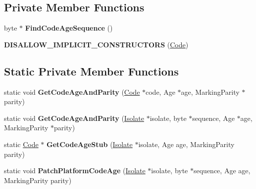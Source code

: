 \subsection*{Private Member Functions}
\begin{DoxyCompactItemize}
\item 
byte $\ast$ {\bfseries Find\+Code\+Age\+Sequence} ()\hypertarget{classv8_1_1internal_1_1_code_af7fe9dd72381ab449b39d57040648c57}{}\label{classv8_1_1internal_1_1_code_af7fe9dd72381ab449b39d57040648c57}

\item 
{\bfseries D\+I\+S\+A\+L\+L\+O\+W\+\_\+\+I\+M\+P\+L\+I\+C\+I\+T\+\_\+\+C\+O\+N\+S\+T\+R\+U\+C\+T\+O\+RS} (\hyperlink{classv8_1_1internal_1_1_code}{Code})\hypertarget{classv8_1_1internal_1_1_code_abd9d152bb12178f233f612a10f4fca1f}{}\label{classv8_1_1internal_1_1_code_abd9d152bb12178f233f612a10f4fca1f}

\end{DoxyCompactItemize}
\subsection*{Static Private Member Functions}
\begin{DoxyCompactItemize}
\item 
static void {\bfseries Get\+Code\+Age\+And\+Parity} (\hyperlink{classv8_1_1internal_1_1_code}{Code} $\ast$code, Age $\ast$age, Marking\+Parity $\ast$parity)\hypertarget{classv8_1_1internal_1_1_code_a511f65827ba88e4b4be505c5b5b450e5}{}\label{classv8_1_1internal_1_1_code_a511f65827ba88e4b4be505c5b5b450e5}

\item 
static void {\bfseries Get\+Code\+Age\+And\+Parity} (\hyperlink{classv8_1_1internal_1_1_isolate}{Isolate} $\ast$isolate, byte $\ast$sequence, Age $\ast$age, Marking\+Parity $\ast$parity)\hypertarget{classv8_1_1internal_1_1_code_a873414ab1fb60cd46dd66780da5fa65a}{}\label{classv8_1_1internal_1_1_code_a873414ab1fb60cd46dd66780da5fa65a}

\item 
static \hyperlink{classv8_1_1internal_1_1_code}{Code} $\ast$ {\bfseries Get\+Code\+Age\+Stub} (\hyperlink{classv8_1_1internal_1_1_isolate}{Isolate} $\ast$isolate, Age age, Marking\+Parity parity)\hypertarget{classv8_1_1internal_1_1_code_a2683a31b700009913b6a69ce43966030}{}\label{classv8_1_1internal_1_1_code_a2683a31b700009913b6a69ce43966030}

\item 
static void {\bfseries Patch\+Platform\+Code\+Age} (\hyperlink{classv8_1_1internal_1_1_isolate}{Isolate} $\ast$isolate, byte $\ast$sequence, Age age, Marking\+Parity parity)\hypertarget{classv8_1_1internal_1_1_code_a454fa5934d02e45dedd21993c9012bca}{}\label{classv8_1_1internal_1_1_code_a454fa5934d02e45dedd21993c9012bca}

\end{DoxyCompactItemize}

